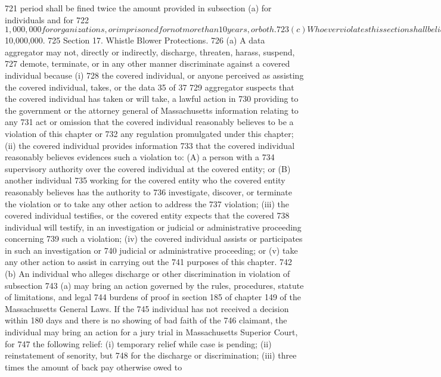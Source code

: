 721 period shall be fined twice the amount provided in subsection (a) for individuals and for
722 $1,000,000 for organizations, or imprisoned for not more than 10 years, or both.
723 (c) Whoever violates this section shall be liable to the state of Massachusetts for a civil
724 fine of not more than $10,000,000.
725 Section 17. Whistle Blower Protections.
726 (a) A data aggregator may not, directly or indirectly, discharge, threaten, harass, suspend,
727 demote, terminate, or in any other manner discriminate against a covered individual because (i)
728 the covered individual, or anyone perceived as assisting the covered individual, takes, or the data
35 of 37
729 aggregator suspects that the covered individual has taken or will take, a lawful action in
730 providing to the government or the attorney general of Massachusetts information relating to any
731 act or omission that the covered individual reasonably believes to be a violation of this chapter or
732 any regulation promulgated under this chapter; (ii) the covered individual provides information
733 that the covered individual reasonably believes evidences such a violation to: (A) a person with a
734 supervisory authority over the covered individual at the covered entity; or (B) another individual
735 working for the covered entity who the covered entity reasonably believes has the authority to
736 investigate, discover, or terminate the violation or to take any other action to address the
737 violation; (iii) the covered individual testifies, or the covered entity expects that the covered
738 individual will testify, in an investigation or judicial or administrative proceeding concerning
739 such a violation; (iv) the covered individual assists or participates in such an investigation or
740 judicial or administrative proceeding; or (v) take any other action to assist in carrying out the
741 purposes of this chapter.
742 (b) An individual who alleges discharge or other discrimination in violation of subsection
743 (a) may bring an action governed by the rules, procedures, statute of limitations, and legal
744 burdens of proof in section 185 of chapter 149 of the Massachusetts General Laws. If the
745 individual has not received a decision within 180 days and there is no showing of bad faith of the
746 claimant, the individual may bring an action for a jury trial in Massachusetts Superior Court, for
747 the following relief: (i) temporary relief while case is pending; (ii) reinstatement of senority, but
748 for the discharge or discrimination; (iii) three times the amount of back pay otherwise owed to
